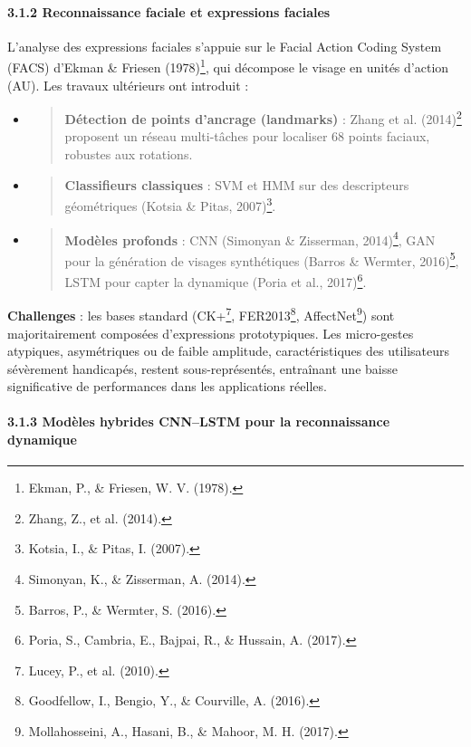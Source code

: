 \documentclass[
]{article}
\begin{document}
\hypertarget{reconnaissance-faciale-et-expressions-faciales}{%
\paragraph{3.1.2 Reconnaissance faciale et expressions faciales}\label{reconnaissance-faciale-et-expressions-faciales}}

L'analyse des expressions faciales s'appuie sur le Facial Action Coding System (FACS) d'Ekman \& Friesen (1978)\footnote{Ekman, P., \& Friesen, W. V. (1978).}, qui décompose le visage en unités d'action (AU). Les travaux ultérieurs ont introduit :

\begin{itemize}
\item
  \begin{quote}
  \textbf{Détection de points d'ancrage (landmarks)} : Zhang et al. (2014)\footnote{Zhang, Z., et al. (2014).} proposent un réseau multi-tâches pour localiser 68 points faciaux, robustes aux rotations.
  \end{quote}
\item
  \begin{quote}
  \textbf{Classifieurs classiques} : SVM et HMM sur des descripteurs géométriques (Kotsia \& Pitas, 2007)\footnote{Kotsia, I., \& Pitas, I. (2007).}.
  \end{quote}
\item
  \begin{quote}
  \textbf{Modèles profonds} : CNN (Simonyan \& Zisserman, 2014)\footnote{Simonyan, K., \& Zisserman, A. (2014).}, GAN pour la génération de visages synthétiques (Barros \& Wermter, 2016)\footnote{Barros, P., \& Wermter, S. (2016).}, LSTM pour capter la dynamique (Poria et al., 2017)\footnote{Poria, S., Cambria, E., Bajpai, R., \& Hussain, A. (2017).}.
  \end{quote}
\end{itemize}

\textbf{Challenges} : les bases standard (CK+\footnote{Lucey, P., et al. (2010).}, FER2013\footnote{Goodfellow, I., Bengio, Y., \& Courville, A. (2016).}, AffectNet\footnote{Mollahosseini, A., Hasani, B., \& Mahoor, M. H. (2017).}) sont majoritairement composées d'expressions prototypiques. Les micro-gestes atypiques, asymétriques ou de faible amplitude, caractéristiques des utilisateurs sévèrement handicapés, restent sous-représentés, entraînant une baisse significative de performances dans les applications réelles.

\hypertarget{moduxe8les-hybrides-cnnlstm-pour-la-reconnaissance-dynamique}{%
\paragraph{3.1.3 Modèles hybrides CNN--LSTM pour la reconnaissance dynamique}\label{moduxe8les-hybrides-cnnlstm-pour-la-reconnaissance-dynamique}}
\end{document}
